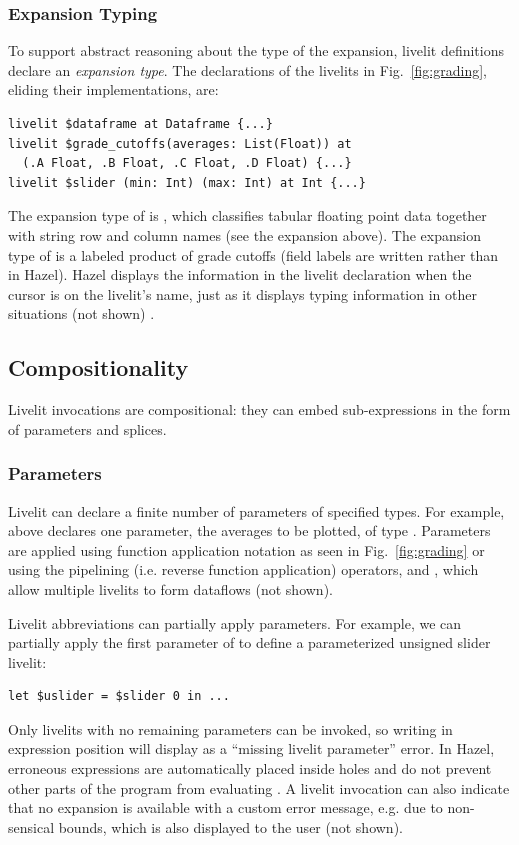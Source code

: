 \subsubsection{Expansion Typing}
\label{sec:expansion-typing}
To support abstract reasoning about the type of the expansion,
livelit definitions declare an \emph{expansion type}.
The declarations of the livelits in Fig.~\ref{fig:grading},
eliding their implementations, are:
\begin{lstlisting}[numbers=none,xleftmargin=0cm]
livelit $dataframe at Dataframe {...}
livelit $grade_cutoffs(averages: List(Float)) at
  (.A Float, .B Float, .C Float, .D Float) {...}
livelit $slider (min: Int) (max: Int) at Int {...}
\end{lstlisting}
The expansion type of  is ,
which classifies tabular floating point data together with string row and column names (see the expansion above).
The expansion type of  is a labeled product of grade cutoffs (field labels are written 
rather than  in Hazel).
Hazel displays the information in the livelit declaration when the cursor is on the livelit's name,
just as it displays typing information in other situations (not shown) \cite{hazeltutor}.

\subsection{Compositionality}\label{sec:splicing-and-parameterization}
Livelit invocations are compositional: they can embed sub-expressions
in the form of parameters and splices.

\subsubsection{Parameters}\label{sec:parameterization}
Livelit can declare a finite number of parameters of specified types.
For example,  above declares one parameter,
the averages to be plotted, of type .
Parameters are applied
using function application notation
as seen in Fig.~\ref{fig:grading} or
using the pipelining (i.e. reverse function application) operators, \li{<|} and \li{|>},
which allow multiple livelits to form dataflows (not shown).

Livelit abbreviations can partially apply parameters. For example,
we can partially apply the first parameter of  to define a parameterized unsigned slider livelit:
\begin{lstlisting}[numbers=none,xleftmargin=0cm]
  let $uslider = $slider 0 in ...
\end{lstlisting}
Only livelits with no remaining parameters can be invoked,
so writing  in expression position will display as a ``missing livelit parameter'' error.
In Hazel, erroneous expressions
are automatically placed inside holes and do not prevent other parts of the program from evaluating
\cite{HazelnutLive}.
A livelit invocation can also indicate that no 
expansion is available with a custom error message, e.g. due to non-sensical bounds,
which is also displayed to the user (not shown).


